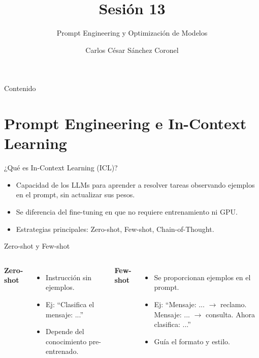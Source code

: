 \documentclass[aspectratio=169, 10pt, xcolor=table]{beamer}
\title[SESIÓN 13 NLP]{\textbf{Sesión 13}}
\subtitle{Prompt Engineering y Optimización de Modelos}
\author[Prof. C. Sánchez]{Carlos César Sánchez Coronel}
\institute{\textbf{NLP}}
\date{}
\begin{document}
\begin{frame}
    \titlepage
\end{frame}

\begin{frame}{Contenido}
    \tableofcontents
\end{frame}

\section{Prompt Engineering e In-Context Learning}

\begin{frame}{¿Qué es In-Context Learning (ICL)?}
    \begin{itemize}
        \item Capacidad de los LLMs para aprender a resolver tareas observando ejemplos en el prompt, sin actualizar sus pesos.
        \item Se diferencia del fine-tuning en que no requiere entrenamiento ni GPU.
        \item Estrategias principales: Zero-shot, Few-shot, Chain-of-Thought.
    \end{itemize}
\end{frame}

\begin{frame}{Zero-shot y Few-shot}
    \begin{columns}[t]
        \textbf{Zero-shot}
        \begin{itemize}
            \item Instrucción sin ejemplos.
            \item Ej: ``Clasifica el mensaje: ...''
            \item Depende del conocimiento pre-entrenado.
        \end{itemize}
        \textbf{Few-shot}
        \begin{itemize}
            \item Se proporcionan ejemplos en el prompt.
            \item Ej: ``Mensaje: ... $\rightarrow$ reclamo. Mensaje: ... $\rightarrow$ consulta. Ahora clasifica: ...''
            \item Guía el formato y estilo.
        \end{itemize}
    \end{columns}
\end{frame}
\end{document}

